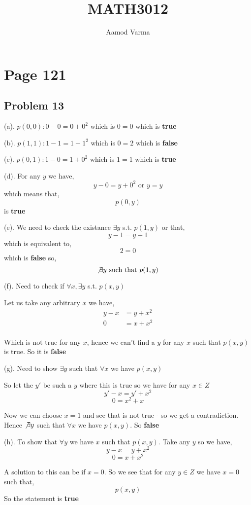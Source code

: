 \documentclass[a4paper]{report}
\title{MATH3012}
\author{Aamod Varma}
\begin{document}
\maketitle


\section*{Page 121}
\subsection*{Problem 13}
(a). $p(0,0): 0 - 0 = 0 + 0^2$ which is $ 0 = 0$ which is \textbf{true}

(b). $p(1,1): 1 - 1 = 1 + 1^2$ which is $0 = 2$ which is  \textbf{false} 

(c). $p(0,1): 1 - 0 = 1 + 0^2$ which is $1 = 1$ which is  \textbf{true}     

(d). For any $y$ we have, 
$$ y - 0 = y + 0^2 \text{ or } y = y $$  which  means that, 
$$ p(0,y) $$  is \textbf{true}


(e). We need to check the existance $\exists y$ s.t. $p(1,y)$ or that,  
$$ y - 1 = y + 1 $$ which is equivalent to, 
$$ 2 = 0 $$  which is \textbf{false}  so, 
$$ \not \exists y \text{ such that }p(1,y) $$ 


(f). Need to check if $\forall x, \exists y$  s.t. $p(x,y)$

Let us take any arbitrary $x$ we have, 
\begin{align*}
    y - x &= y + x^2 \\
    0 &= x + x^2 \\
\end{align*}

Which is not true for any $x$, hence we can't find a  $y$ for any $x$ such that $p(x,y)$ is true. So it is \textbf{false} 

(g). Need to show $\exists y$ such that  $\forall x$ we have $p(x,y)$

So let the  $y'$  be such a $y$ where this is true so we have for any $x \in Z$
$$ y' - x = y' + x^2 $$  
$$  0 =  x^2  + x$$  

Now we can choose $x = 1$ and see that is not true - so we get a contradiction. Hence $\not \exists y $ such that  $\forall x$ we have  $p(x,y)$. So \textbf{false} 


(h). To show that $\forall y$ we have $x$ such that $p(x,y)$. Take any  $y$ so we have, 
$$ y - x = y + x^2 $$ 
$$ 0 = x + x^2 $$ 

A solution to this can be if $x = 0$. So we see that for any $y \in Z$ we have $x = 0$ such that, 
$$ p(x,y) $$ So the statement is \textbf{true} 
\end{document}
